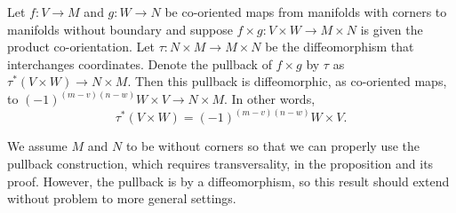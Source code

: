 \begin{proposition}\label{P: exterior commutativity}
	Let $f \colon V \to M$ and $g \colon W \to N$ be co-oriented maps from manifolds with corners to manifolds without boundary and suppose $f \times g \colon V \times W \to M \times N$ is given the product co-orientation.
	Let $\tau \colon N \times M \to M \times N$ be the diffeomorphism that interchanges coordinates.
	Denote the pullback of $f \times g$ by $\tau$ as $\tau^*(V \times W) \to N \times M$. Then this pullback is diffeomorphic, as co-oriented maps, to $(-1)^{(m-v)(n-w)}W \times V \to N \times M$. In other words,
	$$\tau^*(V \times W) = (-1)^{(m-v)(n-w)}W \times V.$$
\end{proposition}
We assume $M$ and $N$ to be without corners so that we can properly use the pullback construction, which requires transversality, in the proposition and its proof.
However, the pullback is by a diffeomorphism, so this result should extend without problem to more general settings.

